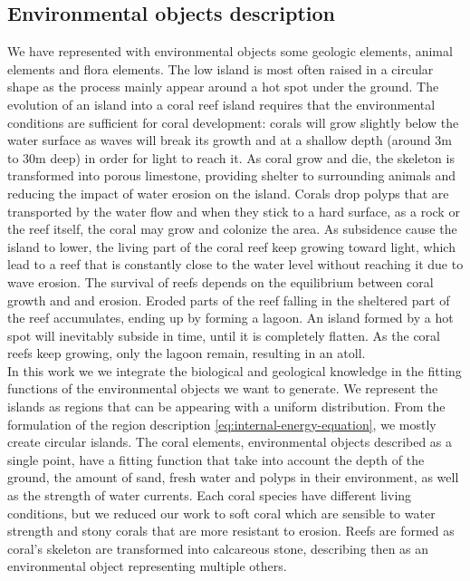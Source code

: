 \subsection{Environmental objects description}
\label{sec:env-obj_represented-objects}
We have represented with environmental objects some geologic elements, animal elements and flora elements. The low island is most often raised in a circular shape as the process mainly appear around a hot spot under the ground. The evolution of an island into a coral reef island requires that the environmental conditions are sufficient for coral development: corals will grow slightly below the water surface as waves will break its growth and at a shallow depth (around 3m to 30m deep) in order for light to reach it. As coral grow and die, the skeleton is transformed into porous limestone, providing shelter to surrounding animals and reducing the impact of water erosion on the island. Corals drop polyps that are transported by the water flow and when they stick to a hard surface, as a rock or the reef itself, the coral may grow and colonize the area. As subsidence cause the island to lower, the living part of the coral reef keep growing toward light, which lead to a reef that is constantly close to the water level without reaching it due to wave erosion. The survival of reefs depends on the equilibrium between coral growth and and erosion. Eroded parts of the reef falling in the sheltered part of the reef accumulates, ending up by forming a lagoon. An island formed by a hot spot will inevitably subside in time, until it is completely flatten. As the coral reefs keep growing, only the lagoon remain, resulting in an atoll. \\
In this work we we integrate the biological and geological knowledge in the fitting functions of the environmental objects we want to generate. We represent the islands as regions that can be appearing with a uniform distribution. From the formulation of the region description \eqref{eq:internal-energy-equation}, we mostly create circular islands. The coral elements, environmental objects described as a single point, have a fitting function that take into account the depth of the ground, the amount of sand, fresh water and polyps in their environment, as well as the strength of water currents. Each coral species have different living conditions, but we reduced our work to soft coral which are sensible to water strength and stony corals that are more resistant to erosion. Reefs are formed as coral's skeleton are transformed into calcareous stone, describing then as an environmental object representing multiple others. 


